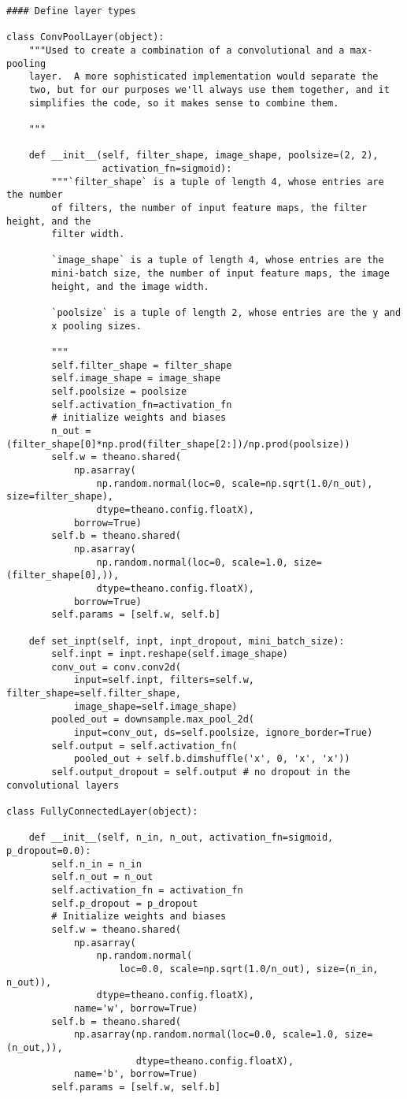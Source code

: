 \begin{lstlisting}
#### Define layer types

class ConvPoolLayer(object):
    """Used to create a combination of a convolutional and a max-pooling
    layer.  A more sophisticated implementation would separate the
    two, but for our purposes we'll always use them together, and it
    simplifies the code, so it makes sense to combine them.

    """

    def __init__(self, filter_shape, image_shape, poolsize=(2, 2),
                 activation_fn=sigmoid):
        """`filter_shape` is a tuple of length 4, whose entries are the number
        of filters, the number of input feature maps, the filter height, and the
        filter width.

        `image_shape` is a tuple of length 4, whose entries are the
        mini-batch size, the number of input feature maps, the image
        height, and the image width.

        `poolsize` is a tuple of length 2, whose entries are the y and
        x pooling sizes.

        """
        self.filter_shape = filter_shape
        self.image_shape = image_shape
        self.poolsize = poolsize
        self.activation_fn=activation_fn
        # initialize weights and biases
        n_out = (filter_shape[0]*np.prod(filter_shape[2:])/np.prod(poolsize))
        self.w = theano.shared(
            np.asarray(
                np.random.normal(loc=0, scale=np.sqrt(1.0/n_out), size=filter_shape),
                dtype=theano.config.floatX),
            borrow=True)
        self.b = theano.shared(
            np.asarray(
                np.random.normal(loc=0, scale=1.0, size=(filter_shape[0],)),
                dtype=theano.config.floatX),
            borrow=True)
        self.params = [self.w, self.b]

    def set_inpt(self, inpt, inpt_dropout, mini_batch_size):
        self.inpt = inpt.reshape(self.image_shape)
        conv_out = conv.conv2d(
            input=self.inpt, filters=self.w, filter_shape=self.filter_shape,
            image_shape=self.image_shape)
        pooled_out = downsample.max_pool_2d(
            input=conv_out, ds=self.poolsize, ignore_border=True)
        self.output = self.activation_fn(
            pooled_out + self.b.dimshuffle('x', 0, 'x', 'x'))
        self.output_dropout = self.output # no dropout in the convolutional layers

class FullyConnectedLayer(object):

    def __init__(self, n_in, n_out, activation_fn=sigmoid, p_dropout=0.0):
        self.n_in = n_in
        self.n_out = n_out
        self.activation_fn = activation_fn
        self.p_dropout = p_dropout
        # Initialize weights and biases
        self.w = theano.shared(
            np.asarray(
                np.random.normal(
                    loc=0.0, scale=np.sqrt(1.0/n_out), size=(n_in, n_out)),
                dtype=theano.config.floatX),
            name='w', borrow=True)
        self.b = theano.shared(
            np.asarray(np.random.normal(loc=0.0, scale=1.0, size=(n_out,)),
                       dtype=theano.config.floatX),
            name='b', borrow=True)
        self.params = [self.w, self.b]


\end{lstlisting}
